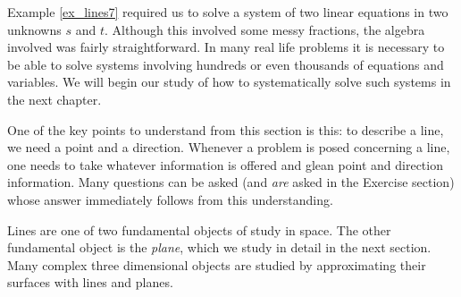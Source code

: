 Example \ref{ex_lines7} required us to solve a system of two linear equations in two unknowns $s$ and $t$. Although this involved some messy fractions, the algebra involved was fairly straightforward. In many real life problems it is necessary to be able to solve systems involving hundreds or even thousands of equations and variables. We will begin our study of how to systematically solve such systems in the next chapter.


One of the key points to understand from this section is this: to describe a line, we need a point and a direction. Whenever a problem is posed concerning a line, one  needs to take whatever information is offered and glean point and direction information. Many questions can be asked (and \emph{are} asked in the Exercise section) whose answer immediately follows from this understanding. 

Lines are one of two fundamental objects of study in space. The other fundamental object is the \emph{plane}, which we study in detail in the next section. Many complex three dimensional objects are studied by approximating their surfaces with lines and planes.





